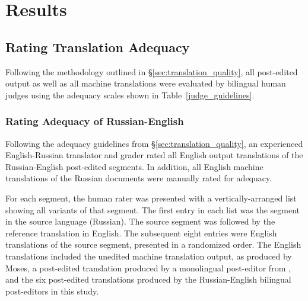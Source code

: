 






\vspace{-2mm}
\section{Results}
\label{sec:results}

\vspace{-2mm}
\subsection{Rating Translation Adequacy}

Following the methodology outlined in \S\ref{sec:translation_quality}, all post-edited output as well as all machine translations were evaluated by bilingual human judges using the adequacy scales shown in Table~\ref{judge_guidelines}. %


\subsubsection{Rating Adequacy of Russian-English}


Following the adequacy guidelines from \S\ref{sec:translation_quality}, %
%
an experienced English-Russian translator and grader rated all English output translations of the Russian-English post-edited segments.
%
In addition, all English machine translations of the Russian documents were manually rated for adequacy.

For each segment, the human rater was presented with a vertically-arranged list showing all variants of that segment.
%
The first entry in each list was the segment in the source language (Russian).
%
The source segment was followed by the reference translation in English.
%
The subsequent eight entries were English translations of the source segment, presented in a randomized order.
%
The English translations included the unedited machine translation output, as produced by Moses,
%
a post-edited translation produced by a monolingual post-editor from \citet{2014_WMT_Schwartz_etal},
%
and the six post-edited translations produced by the Russian-English bilingual post-editors in this study.

